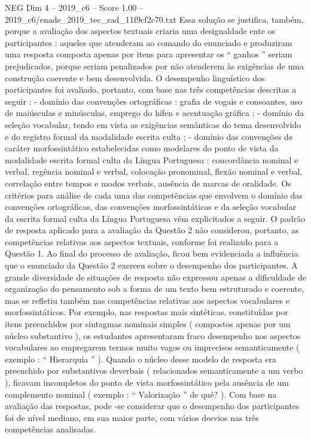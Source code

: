 \begin{textsample}{NEG Dim 4 – 2019\_c6 – Score 1.00 – 2019\_c6/enade\_2019\_tec\_rad\_11f9cf2c70.txt}
Essa solução se justifica, também, porque a avaliação dos aspectos textuais criaria uma desigualdade ente os participantes : aqueles que atenderam ao comando do enunciado e produziram uma resposta composta apenas por itens para apresentar os “ ganhos ” seriam prejudicados, porque seriam penalizados por não atenderem às exigências de uma construção coerente e bem desenvolvida.
O desempenho linguístico dos participantes foi avaliado, portanto, com base nas três competências descritas a seguir : - domínio das convenções ortográficas : grafia de vogais e consoantes, uso de maiúsculas e minúsculas, emprego do hífen e acentuação gráfica ; - domínio da seleção vocabular, tendo em vista as exigências semânticas do tema desenvolvido e do registro formal da modalidade escrita culta ; - domínio das convenções de caráter morfossintático estabelecidas como modelares do ponto de vista da modalidade escrita formal culta da Língua Portuguesa : concordância nominal e verbal, regência nominal e verbal, colocação pronominal, flexão nominal e verbal, correlação entre tempos e modos verbais, ausência de marcas de oralidade.
Os critérios para análise de cada uma das competências que envolvem o domínio das convenções ortográficas, das convenções morfossintáticas e da seleção vocabular da escrita formal culta da Língua Portuguesa vêm explicitados a seguir.
O padrão de resposta aplicado para a avaliação da Questão 2 não considerou, portanto, as competências relativas aos aspectos textuais, conforme foi realizado para a Questão 1.
Ao final do processo de avaliação, ficou bem evidenciada a influência que o enunciado da Questão 2 exerceu sobre o desempenho dos participantes.
A grande diversidade de situações de resposta não expressou apenas a dificuldade de organização do pensamento sob a forma de um texto bem estruturado e coerente, mas se refletiu também nas competências relativas aos aspectos vocabulares e morfossintáticos.
Por exemplo, nas respostas mais sintéticas, constituídas por itens preenchidos por sintagmas nominais simples ( compostos apenas por um núcleo substantivo ), os estudantes apresentaram fraco desempenho nos aspectos vocabulares ao empregarem termos muito vagos ou imprecisos semanticamente ( exemplo : “ Hierarquia ” ).
Quando o núcleo desse modelo de resposta era preenchido por substantivos deverbais ( relacionados semanticamente a um verbo ), ficavam incompletos do ponto de vista morfossintático pela ausência de um complemento nominal ( exemplo : “ Valorização ” de quê? ).
Com base na avaliação das respostas, pode -se considerar que o desempenho dos participantes foi de nível mediano, em sua maior parte, com vários desvios nas três competências analisadas.

\end{textsample}

